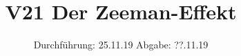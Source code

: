 

\subject{Vxxx}
\title{V21 Der Zeeman-Effekt}
\date{
  Durchführung: 25.11.19
  \hspace{3em}
  Abgabe: ??.11.19
}



\maketitle
\thispagestyle{empty}
\tableofcontents
\newpage




%



\newpage
\printbibliography


